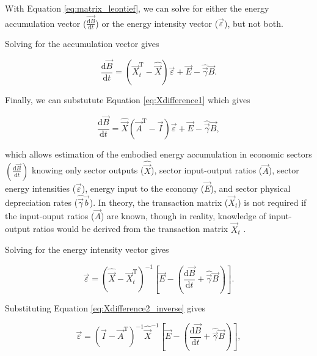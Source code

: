 With Equation \ref{eq:matrix_leontief}, we can solve for either the energy accumulation vector ($\vec{\frac{\mathrm{d}B}{\mathrm{d}t}}$) or the energy intensity vector ($\vec{\varepsilon}$), but not both. 

Solving for the accumulation vector gives

\begin{equation} \label{eq:dB_dt_leontief}
	\frac{\mathrm{d}\vec{B}}{\mathrm{d}t} = (\vec{X}_{t}^{\mathrm{T}} - \hat{\vec{X}})\vec{\varepsilon} + \vec{E} - \hat{\vec{\gamma}}\vec{B}.
\end{equation}

\noindent Finally, we can substutute Equation \ref{eq:Xdifference1} which gives

\begin{equation} \label{eq:dB_dt_leontief_with_A}
	\frac{\mathrm{d}\vec{B}}{\mathrm{d}t} = \hat{\vec{X}} (\vec{A}^{\mathrm{T}} - \vec{I}) \vec{\varepsilon} + \vec{E} - \hat{\vec{\gamma}}\vec{B},
\end{equation}

\noindent which allows estimation of the embodied energy accumulation in economic sectors $\left(\frac{\mathrm{d}\vec{B}}{\mathrm{d}t}\right)$ knowing only sector outputs ($\hat{\vec{X}}$), sector input-output ratios ($\vec{A}$), sector energy intensities ($\vec{\varepsilon}$), energy input to the economy ($\vec{E}$), and sector physical depreciation rates ($\hat{\vec{\gamma}}\vec{b}$). In theory, the transaction matrix ($\vec{X}_{t}$) is not required if the input-ouput ratios ($\vec{A}$) are known, though in reality, knowledge of input-output ratios would be derived from the transaction matrix $\vec{X}_{t}$ .

Solving for the energy intensity vector gives

\begin{equation} \label{eq:epsilon_leontief}
	\vec{\varepsilon} = (\hat{\vec{X}} - \vec{X}_{t}^{\mathrm{T}})^{-1}\left[\vec{E} - \left(\frac{\mathrm{d}\vec{B}}{\mathrm{d}t} + \hat{\vec{\gamma}}\vec{B}\right)\right].
\end{equation}

\noindent Substituting Equation \ref{eq:Xdifference2_inverse} gives

\begin{equation} \label{eq:epsilon_leontief_with_A}
	\vec{\varepsilon} = (\vec{I} - \vec{A}^{\mathrm{T}})^{-1}\hat{\vec{X}}^{-1}\left[\vec{E} - \left(\frac{\mathrm{d}\vec{B}}{\mathrm{d}t} + \hat{\vec{\gamma}}\vec{B}\right)\right],
\end{equation}

